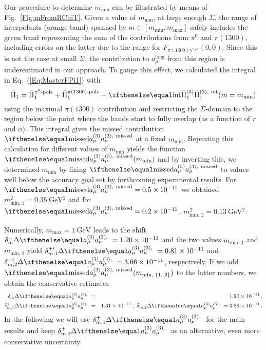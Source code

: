 Our procedure to determine $m_\text{min}$ can be illustrated by means of Fig.~\ref{Fig:mFromRChiT}. Given a value of $m_\text{min}$, at large enough $\Sigma$, the range of interpolants (orange band) spanned by $m\in [m_\text{min},m_\text{max}]$ safely includes the green band representing the sum of the contributions from $\pi^0$ and $\pi(1300)$, including errors on the latter due to the range for $F_{\pi(1300)\gamma^*\gamma^*}(0,0)$. Since this is not the case at small $\Sigma$, the contribution to $a_\mu^\text{long}$ from this region is underestimated in our approach. To gauge this effect, we calculated the integral in Eq.~(\ref{Eq:MasterFPi1}) with
\begin{equation}
\bar{\Pi}_1 = \bar{\Pi}_1^\text{$\pi^0$-pole} + \bar{\Pi}_1^\text{$\pi(1300)$-pole} - \Pipion[\text{int}](m=m_\text{min})
\label{Eq:Pi_miss}
\end{equation}
using the maximal $\pi(1300)$ contribution and restricting the $\Sigma$-domain to the region below the point where the bands start to fully overlap (as a function of $r$ and $\phi$). This integral gives the missed contribution $\aPion[\text{missed}]$ at a fixed $m_\text{min}$. Repeating this calculation for different values of $m_\text{min}$ yields the function $\aPion[\text{missed}](m_\text{min})$ and by inverting this, we determined $m_\text{min}$ by fixing $\aPion[\text{missed}]$ to values well below the accuracy goal set by forthcoming experimental results.
For $\aPion[\text{missed}] = \num{0.5e-11}$ we obtained $m_\text{min, 1}^2 = \SI{0.35}{\GeV^2}$ and for $\aPion[\text{missed}] = \num{0.2e-11}$, $m_\text{min, 2}^2 = \SI{0.13}{\GeV^2}$.

Numerically, $m_\text{max} = \SI{1}{\GeV}$ leads to the shift $\delta_{m}^- \Delta \aPion = \num{1.20e-11}$ and the two values $m_\text{min, 1}$ and $m_\text{min, 2}$ yield $\delta_{m, 1}^{+\prime} \Delta \aPion = \num{0.81e-11}$ and $\delta_{m, 2}^{+\prime} \Delta \aPion = \num{3.66e-11}$, respectively. If we add $\aPion[\text{missed}](m_\text{min, \{1, 2\}})$ to the latter numbers, we obtain the conservative estimates
\begin{eqnarray}
\delta_{m}^- \Delta \aPion & = & \num{1.20e-11}\,, \nonumber \\
\delta_{m, 1}^+ \Delta \aPion & = & \num{1.31e-11}\,, \  \delta_{m, 2}^+ \Delta \aPion = \num{3.86e-11}\,.
\label{Eq:NumMatching}
\end{eqnarray}
In the following we will use  $\delta_{m, 1}^+ \Delta \aPion$ for the main results and keep $\delta_{m, 2}^+ \Delta \aPion$ as an alternative, even more conservative uncertainty. 

